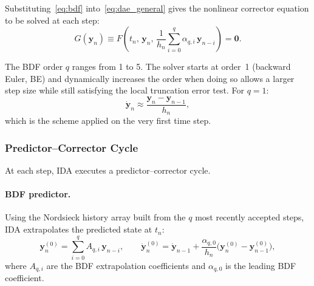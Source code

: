 \begin{refsection}
Substituting~\eqref{eq:bdf} into~\eqref{eq:dae_general} gives the nonlinear corrector equation to be solved at each step:
\begin{equation}
  G(\mathbf{y}_n) \equiv
  F\!\!\left(t_n,\,\mathbf{y}_n,\,
    \frac{1}{h_n}\sum_{i=0}^{q}\alpha_{q,i}\,\mathbf{y}_{n-i}\right) = \mathbf{0}.
  \label{eq:corrector}
\end{equation}

The BDF order $q$ ranges from 1 to 5.  The solver starts at order~1 (backward Euler, BE) and dynamically increases the order when doing so allows a larger step size while still satisfying the local truncation error test.  For $q=1$:
\begin{equation}
  \dot{\mathbf{y}}_n \approx \frac{\mathbf{y}_n - \mathbf{y}_{n-1}}{h_n},
  \label{eq:be}
\end{equation}
which is the scheme applied on the very first time step.

\subsubsection{Predictor--Corrector Cycle}

At each step, IDA executes a predictor--corrector cycle.

\paragraph{BDF predictor.} Using the Nordsieck history array built from the $q$ most recently accepted steps, IDA extrapolates the predicted state at $t_n$:
\begin{equation}
  \mathbf{y}_n^{(0)} = \sum_{i=0}^{q} A_{q,i}\,\mathbf{y}_{n-i},
  \qquad
  \dot{\mathbf{y}}_n^{(0)} = \dot{\mathbf{y}}_{n-1}
    + \frac{\alpha_{q,0}}{h_n}\bigl(\mathbf{y}_n^{(0)} - \mathbf{y}_{n-1}^{(0)}\bigr),
  \label{eq:predictor}
\end{equation}
where $A_{q,i}$ are the BDF extrapolation coefficients and $\alpha_{q,0}$ is the leading BDF coefficient.


\end{refsection}

